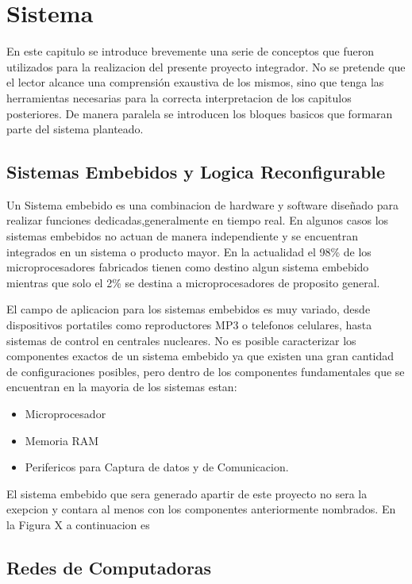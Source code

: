 \chapter{Sistema}
En este capitulo se introduce brevemente una serie de conceptos que fueron utilizados para la realizacion del presente proyecto integrador. No se pretende que el lector alcance una comprensión exaustiva de los mismos, sino que tenga las herramientas necesarias para la correcta interpretacion de los capitulos posteriores. De manera paralela se introducen los bloques basicos que formaran parte del sistema planteado.

\section{Sistemas Embebidos y Logica Reconfigurable}
Un Sistema embebido es una combinacion de hardware y software diseñado para realizar funciones dedicadas,generalmente en tiempo real. En algunos casos los sistemas embebidos no actuan de manera independiente y se encuentran integrados en un sistema o producto mayor. 
En la actualidad el 98\% de los microprocesadores fabricados tienen como destino algun sistema embebido mientras que solo el 2\% se destina a microprocesadores de proposito general.

El campo de aplicacion para los sistemas embebidos es muy variado, desde dispositivos portatiles como reproductores MP3 o telefonos celulares, hasta sistemas de control en centrales nucleares. 
No es posible caracterizar los componentes exactos de un sistema embebido ya que existen una gran cantidad de configuraciones posibles, pero dentro de los componentes fundamentales que se encuentran en la mayoria de los sistemas estan:

\begin{itemize}
\item Microprocesador
\item Memoria RAM 
\item Perifericos para Captura de datos y de Comunicacion.
\end{itemize}

El sistema embebido que sera generado apartir de este proyecto no sera la exepcion y contara al menos con los componentes anteriormente nombrados. En la Figura X a continuacion es 



\section{Redes de Computadoras}

